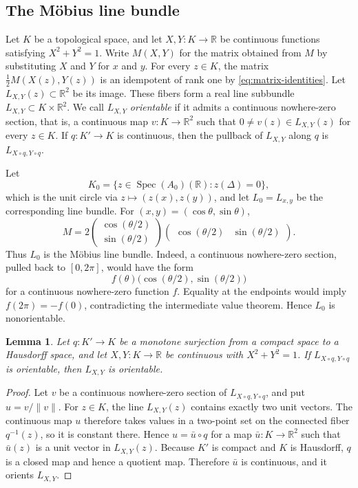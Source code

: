 \documentclass[11pt]{amsart}
\numberwithin{equation}{section}
\newtheorem{lemma}[theorem]{Lemma}
\theoremstyle{definition}
\newcommand{\R}{\mathbb{R}}
\DeclareMathOperator{\Spec}{Spec}
\begin{document}
\subsection{The M\"obius line bundle}
Let $K$ be a topological space, and let $X,Y:K\to\R$ be continuous functions satisfying $X^2+Y^2=1$. Write $M(X,Y)$ for the matrix obtained from $M$ by substituting $X$ and $Y$ for $x$ and $y$. For every $z\in K$, the matrix $\frac12M(X(z),Y(z))$ is an idempotent of rank one by \eqref{eq:matrix-identities}. Let $L_{X,Y}(z)\subset\R^2$ be its image. These fibers form a real line subbundle $L_{X,Y}\subset K\times\R^2$. We call $L_{X,Y}$ \emph{orientable} if it admits a continuous nowhere-zero section, that is, a continuous map $v:K\to\R^2$ such that $0\ne v(z)\in L_{X,Y}(z)$ for every $z\in K$. If $q:K'\to K$ is continuous, then the pullback of $L_{X,Y}$ along $q$ is $L_{X\circ q,Y\circ q}$.

Let
\[
  K_0=\{z\in\Spec(A_0)(\R):z(\Delta)=0\},
\]
which is the unit circle via $z\mapsto(z(x),z(y))$, and let $L_0=L_{x,y}$ be the corresponding line bundle. For $(x,y)=(\cos\theta,\sin\theta)$,
\begin{equation}\label{eq:half-angle}
  M=2
  \begin{pmatrix}\cos(\theta/2)\\ \sin(\theta/2)\end{pmatrix}
  \begin{pmatrix}\cos(\theta/2)&\sin(\theta/2)\end{pmatrix}.
\end{equation}
Thus $L_0$ is the M\"obius line bundle. Indeed, a continuous nowhere-zero section, pulled back to $[0,2\pi]$, would have the form
\[
  f(\theta)\bigl(\cos(\theta/2),\sin(\theta/2)\bigr)
\]
for a continuous nowhere-zero function $f$. Equality at the endpoints would imply $f(2\pi)=-f(0)$, contradicting the intermediate value theorem. Hence $L_0$ is nonorientable.

\begin{lemma}\label{lem:orientation-descent}
Let $q:K'\to K$ be a monotone surjection from a compact space to a Hausdorff space, and let $X,Y:K\to\R$ be continuous with $X^2+Y^2=1$. If $L_{X\circ q,Y\circ q}$ is orientable, then $L_{X,Y}$ is orientable.
\end{lemma}

\begin{proof}
Let $v$ be a continuous nowhere-zero section of $L_{X\circ q,Y\circ q}$, and put $u=v/\|v\|$. For $z\in K$, the line $L_{X,Y}(z)$ contains exactly two unit vectors. The continuous map $u$ therefore takes values in a two-point set on the connected fiber $q^{-1}(z)$, so it is constant there. Hence $u=\bar u\circ q$ for a map $\bar u:K\to\R^2$ such that $\bar u(z)$ is a unit vector in $L_{X,Y}(z)$. Because $K'$ is compact and $K$ is Hausdorff, $q$ is a closed map and hence a quotient map. Therefore $\bar u$ is continuous, and it orients $L_{X,Y}$.
\end{proof}
\end{document}
